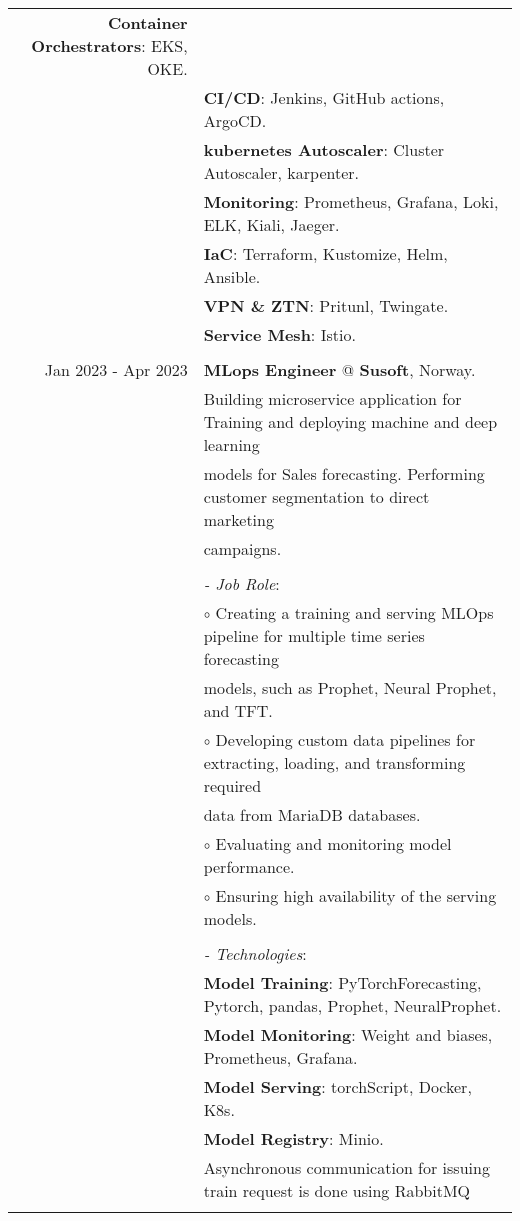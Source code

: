 \documentclass[a4paper,10pt]{article}
\begin{document}
\begin{longtable}{r|l}
    \textbf{Container Orchestrators}: EKS, OKE. \\&
    \textbf{CI/CD}: Jenkins, GitHub actions, ArgoCD. \\&
    \textbf{kubernetes Autoscaler}: Cluster Autoscaler, karpenter. \\&
    \textbf{Monitoring}: Prometheus, Grafana, Loki, ELK, Kiali, Jaeger. \\&
    \textbf{IaC}: Terraform, Kustomize, Helm, Ansible.\\&
    \textbf{VPN \& ZTN}: Pritunl, Twingate. \\&
    \textbf{Service Mesh}: Istio. \\&
    \\
    Jan 2023 - Apr 2023 & \textbf{MLops Engineer} @
    \textbf{Susoft}, Norway. \\& 
    Building microservice application for Training and deploying machine and deep learning \\& models for Sales forecasting. 
    Performing customer segmentation to direct marketing \\& campaigns. \\&
    \\&
    \textit{- Job Role}:\\&
    $\circ$ Creating a training and serving MLOps pipeline for multiple time series 
    forecasting \\ & models, such as Prophet, Neural Prophet, and TFT. \\ &
    $\circ$ Developing custom data pipelines for extracting, loading, and transforming  
    required \\ & data from MariaDB databases. \\ &
    $\circ$ Evaluating and monitoring model performance. \\ &
    $\circ$ Ensuring high availability of the serving models. \\ &
    \\&
    \textit{- Technologies}:\\&
     \textbf{Model Training}: PyTorchForecasting, Pytorch, pandas, Prophet, NeuralProphet. \\&
     \textbf{Model Monitoring}: Weight and biases, Prometheus, Grafana.\\&
     \textbf{Model Serving}: torchScript, Docker, K8s. \\&
     \textbf{Model Registry}: Minio. \\&
    Asynchronous communication for issuing train request is done using RabbitMQ \\&

\end{longtable}
\end{document}

